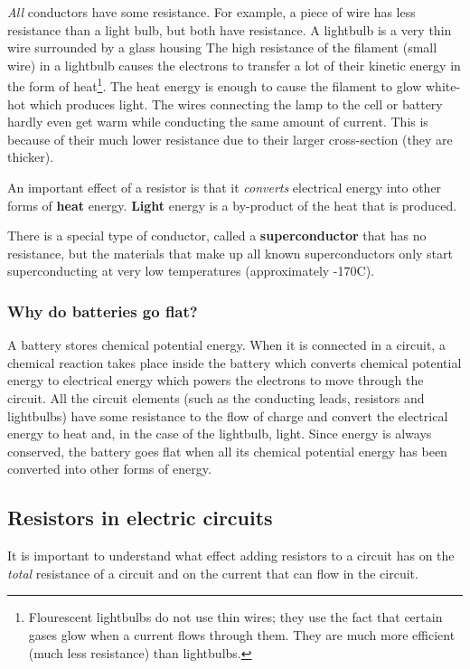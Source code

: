 \textit{All} conductors have some resistance. For example, a piece of wire
has less resistance than a light bulb, but both have resistance. A lightbulb is a very thin wire surrounded by a glass housing The high resistance of the filament (small wire) in a lightbulb causes the electrons to 
transfer a lot of their kinetic energy in the form of heat\footnote{Flourescent lightbulbs do not use thin wires; they use the fact that certain gases glow when a current flows through them. They are much more efficient (much less resistance) than lightbulbs.}. The heat energy is enough
to cause the filament to glow white-hot which produces light. The wires
connecting the lamp to the cell or battery hardly even get warm while
conducting the same amount of current. This is because of their
much lower resistance due to their larger cross-section (they are thicker).

An important effect of a resistor is that it \textit{converts} electrical
energy into other forms of \textbf{heat} energy. \textbf{Light} energy is a by-product of the heat that is produced.

\begin{IFact}{There is a special type of conductor,
called a \textbf{superconductor} that has no resistance, but the
materials that make up all known superconductors only start superconducting
at very low temperatures (approximately -170\deg C).}
\end{IFact}

\subsubsection{Why do batteries go flat?}
A battery stores chemical potential energy. When it is connected in a circuit, a chemical reaction takes place inside the battery which converts chemical potential energy to electrical energy which powers the electrons to move through the circuit. All the circuit elements (such as the conducting leads, resistors and lightbulbs) have some resistance to the flow of charge and convert the electrical energy to heat and, in the case of the lightbulb, light.
Since energy is always conserved, the battery goes flat when all its chemical potential energy has been converted into other forms of energy.

\subsection{Resistors in electric circuits}
It is important to understand what effect adding resistors to a circuit has on the \textit{total} resistance of a circuit and on the current that can flow in the circuit. 

